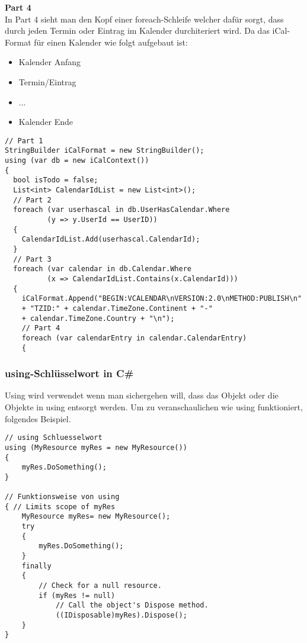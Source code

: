 \textbf{Part 4} \\
In Part 4 sieht man den Kopf einer foreach-Schleife welcher dafür sorgt, dass durch jeden Termin oder Eintrag im Kalender durchiteriert wird. Da das iCal-Format für einen Kalender wie folgt aufgebaut ist: 
\begin{itemize}
\item Kalender Anfang
\item Termin/Eintrag
\item ...
\item Kalender Ende
\end{itemize}

\begin{lstlisting}[caption=Parser Verbindung zur DB mit dem Entity Framework, label=lst:test]
// Part 1
StringBuilder iCalFormat = new StringBuilder();
using (var db = new iCalContext())
{
  bool isTodo = false;
  List<int> CalendarIdList = new List<int>();
  // Part 2
  foreach (var userhascal in db.UserHasCalendar.Where
  		  (y => y.UserId == UserID))
  {
	CalendarIdList.Add(userhascal.CalendarId);
  }
  // Part 3
  foreach (var calendar in db.Calendar.Where
  		  (x => CalendarIdList.Contains(x.CalendarId)))
  {
    iCalFormat.Append("BEGIN:VCALENDAR\nVERSION:2.0\nMETHOD:PUBLISH\n"
	+ "TZID:" + calendar.TimeZone.Continent + "-" 
    + calendar.TimeZone.Country + "\n");
    // Part 4
    foreach (var calendarEntry in calendar.CalendarEntry)
    {
\end{lstlisting} 
\subsubsection{using-Schlüsselwort in C\#}
\label{usingkeyword}
Using wird verwendet wenn man sichergehen will, dass das Objekt oder die Objekte in using entsorgt werden. Um zu veranschaulichen wie using funktioniert, folgendes Beispiel.

\begin{lstlisting}[caption=Parser funktionsweise von using, label=lst:test]
// using Schluesselwort
using (MyResource myRes = new MyResource())
{
    myRes.DoSomething();
}
 
// Funktionsweise von using 
{ // Limits scope of myRes
    MyResource myRes= new MyResource();
    try
    {
        myRes.DoSomething();
    }
    finally
    {
        // Check for a null resource.
        if (myRes != null)
            // Call the object's Dispose method.
            ((IDisposable)myRes).Dispose();
    }
}
\end{lstlisting} 
\textcite{ParserUsingKeyword}
